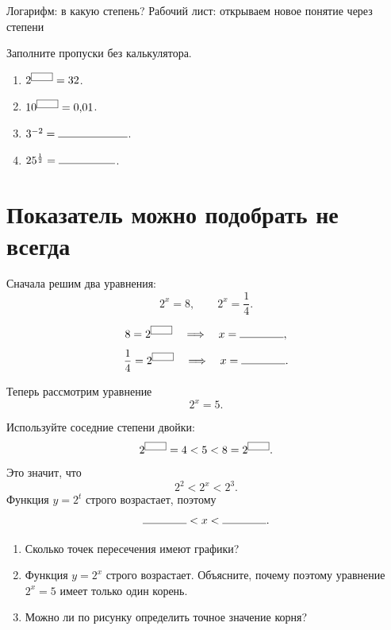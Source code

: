 
\worksheettitle
  {Логарифм: в какую степень?}
  {Рабочий лист: открываем новое понятие через степени}

\studentnameblock

\begin{checkpointbox}
  Заполните пропуски без калькулятора.
  \begin{enumerate}[label=\textbf{\arabic*.},itemsep=0.48em]
    \item \(2^{\mathgap[6mm]}=32\).
    \item \(10^{\mathgap[6mm]}=0{,}01\).
    \item \(3^{-2}=\answerblank[22mm]\).
    \item \(25^{\frac12}=\answerblank[18mm]\).
  \end{enumerate}
\end{checkpointbox}



\section{Показатель можно подобрать не всегда}

Сначала решим два уравнения:
\[
  2^x=8,
  \qquad
  2^x=\frac14.
\]

\begin{fillbox}
  \[
8=2^{\mathgap[6mm]}
    \quad\Longrightarrow\quad
    x=\answerblank[14mm],
  \]
  \[
    \frac14=2^{\mathgap[6mm]}
    \quad\Longrightarrow\quad
    x=\answerblank[14mm].
  \]
\end{fillbox}

Теперь рассмотрим уравнение
\[
  2^x=5.
\]

\begin{thinkbox}
  Используйте соседние степени двойки:
  \[
    2^{\mathgap[6mm]}=4<5<8=2^{\mathgap[6mm]}.
  \]
  Это значит, что
  \[
    2^2<2^x<2^3.
  \]
  Функция \(y=2^t\) строго возрастает, поэтому
  \[
    \answerblank[14mm]<x<\answerblank[14mm].
  \]
\end{thinkbox}

\logmotivationworksheetfigure

\begin{checkpointbox}
  \begin{enumerate}
    \item Сколько точек пересечения имеют графики? \answerblank[18mm]
    \item Функция \(y=2^x\) строго возрастает. Объясните, почему поэтому
      уравнение \(2^x=5\) имеет только один корень.
    \item Можно ли по рисунку определить точное значение корня?
      \answerblank[25mm]
  \end{enumerate}
\end{checkpointbox}

